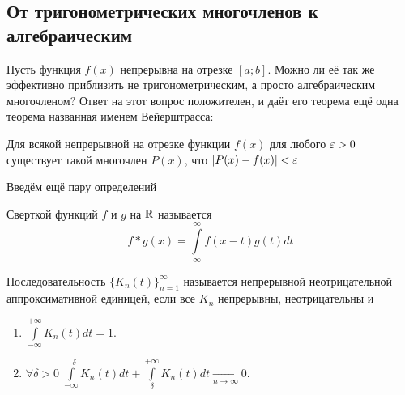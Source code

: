 \documentclass[a4paper, 12pt]{article}
\begin{document}
\subsection{От тригонометрических многочленов к алгебраическим}
Пусть функция $f(x)$ непрерывна на отрезке $[a;b]$. Можно ли её так же эффективно приблизить не тригонометрическим, а просто алгебраическим многочленом? Ответ на этот вопрос положителен, и даёт его теорема ещё одна теорема названная именем Вейерштрасса:
\begin{Theorem}[Вейерштрасс]
	Для всякой непрерывной на отрезке функции $f(x)$ для любого $\varepsilon > 0$ существует такой многочлен $P(x)$, что $|P(x) - f(x)| < \varepsilon$
\end{Theorem}
Введём ещё пару определений
\begin{Def}
	Сверткой функций $f$ и $g$ на $\mathbb{R}$ называется
	$$
		f*g(x) = \int\limits_{\infty}^{\infty} f(x-t)g(t) dt
	$$
\end{Def}
\begin{Def}
	Последовательность $\{K_n(t)\}_{n=1}^{\infty}$ называется непрерывной неотрицательной аппроксимативной единицей, если все $K_n$ непрерывны, неотрицательны и
	\begin{enumerate}
		\item $\int\limits_{-\infty}^{+\infty}K_n(t) dt = 1$.
		\item $\forall \delta > 0 \; \int\limits_{-\infty}^{-\delta}K_n(t)dt + \int\limits_{\delta}^{+\infty}K_n(t) dt \underset{n \to \infty}{\longrightarrow}0$.
	\end{enumerate}
\end{Def}
\end{document}
